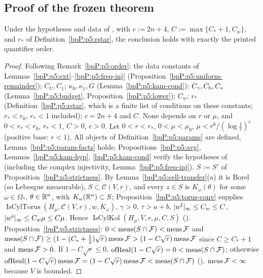 \subsection{Proof of the frozen theorem}\label{bpP:p5:proof}

\begin{theorem}\label{bpP:p5:main}
Under the hypotheses and data of , with $c:=2n+4$, $C:=\max\{C_*+1,C_w\}$, and $r_*$ of Definition~\ref{bpP:p5:rstar}, the conclusion holds with exactly the printed quantifier order.
\end{theorem}
\begin{proof}
\label{stepP:p5:mn-const} Following Remark~\ref{bpP:p5:order}: the data constants of Lemmas~\ref{bpP:p5:ext}--\ref{bpP:p5:freq-inj} (Proposition~\ref{bpP:p5:uniform-remainder}); $C_U,C_1$; $\kappa_0,\kappa_1,G$ (Lemma~\ref{bpP:p5:kam-cond}); $C_\gamma,C_{\rm b},C_*$ (Lemma~\ref{bpP:p5:budget}, Proposition~\ref{bpP:p5:lower}); $C_w$; $r_*$ (Definition~\ref{bpP:p5:rstar}, which is a finite list of conditions on these constants; $r_*<r_0$, $r_*<1$ included); $c=2n+4$ and $C$. None depends on $r$ or $\mu$, and $0<r_*<r_0$, $r_*<1$, $C>0$, $c>0$.
\label{stepP:p5:mn-given} Let $0<r<r_*$, $0<\mu<\mu_0$, $\mu<r^6/(\log\frac1r)^c$ (positive base: $r<1$). All objects of Definition~\ref{bpP:p5:params} are defined, Lemma~\ref{bpP:p5:param-facts} holds; Propositions~\ref{bpP:p5:avg}, Lemmas~\ref{bpP:p5:kam-hyp}, \ref{bpP:p5:kam-cond} verify the hypotheses of  (including the complex injectivity, Lemma~\ref{bpP:p5:freq-inj}).
\label{stepP:p5:mn-set} $S:=S'$ of Proposition~\ref{bpP:p5:strictness}. By Lemma~\ref{bpP:p5:cell-transfer}(a) it is Borel (so Lebesgue measurable), $S\subset\mathcal C(V,r)$, and every $z\in S$ is $K_\omega(\theta)$ for some $\omega\in\Omega_*$, $\theta\in\mathbb{R}^n$, with $K_\omega(\mathbb{R}^n)\subset S$; Proposition~\ref{bpP:p5:torus-conv} supplies $\operatorname{IsCylTorus}(H_\mu,\mathcal C(V,r),w,K_\omega)$, $\gamma>0$, $\tau>a+b$, $\lvert w^{\rm f}\rvert_\infty\le C_w\le C$, $\lvert w^{\rm s}\rvert_\infty\le C_w\mu\le C\mu$. Hence $\operatorname{IsCylKol}(H_\mu,V,r,\mu,C,S)$ ().
\label{stepP:p5:mn-meas} Proposition~\ref{bpP:p5:strictness}: $0<\operatorname{meas}(S\cap\mathcal F)<\operatorname{meas}\mathcal F$ and $\operatorname{meas}(S\cap\mathcal F)\ge(1-(C_*+\frac12)\sqrt r)\operatorname{meas}\mathcal F>(1-C\sqrt r)\operatorname{meas}\mathcal F$ since $C\ge C_*+1$ and $\operatorname{meas}\mathcal F>0$. If $1-C\sqrt r\le0$, $\operatorname{ofReal}(1-C\sqrt r)=0<\operatorname{meas}(S\cap\mathcal F)$; otherwise $\operatorname{ofReal}(1-C\sqrt r)\operatorname{meas}\mathcal F=(1-C\sqrt r)\operatorname{meas}\mathcal F<\operatorname{meas}(S\cap\mathcal F)$ (). $\operatorname{meas}\mathcal F<\infty$ because $V$ is bounded.
\end{proof}

